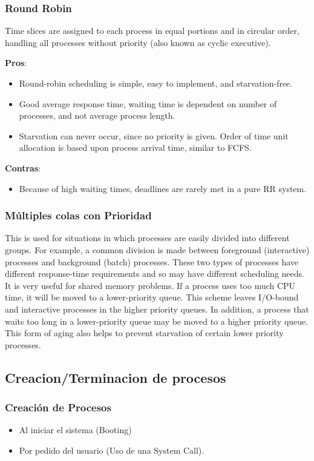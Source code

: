 \documentclass[a4paper, twoside]{article}
\begin{document}
\subsubsection{Round Robin}
Time slices are assigned to each process in equal portions and in circular order, handling all processes without priority (also known as cyclic executive). 

\textbf{Pros}:
\begin{itemize}
	\item Round-robin scheduling is simple, easy to implement, and starvation-free.
	\item Good average response time, waiting time is dependent on number of processes, and not average process length.
	\item Starvation can never occur, since no priority is given. Order of time unit allocation is based upon process arrival time, similar to FCFS.
\end{itemize}

\textbf{Contras}:
\begin{itemize}
	\item Because of high waiting times, deadlines are rarely met in a pure RR system.
\end{itemize}

\subsubsection{Múltiples colas con Prioridad}
This is used for situations in which processes are easily divided into different groups. For example, a common division is made between foreground (interactive) processes and background (batch) processes. These two types of processes have different response-time requirements and so may have different scheduling needs. It is very useful for shared memory problems.
If a process uses too much CPU time, it will be moved to a lower-priority queue. This scheme leaves I/O-bound and interactive processes in the higher priority queues. In addition, a process that waits too long in a lower-priority queue may be moved to a higher priority queue. This form of aging also helps to prevent starvation of certain lower priority processes.

\subsection{Creacion/Terminacion de procesos}
\subsubsection{Creación de Procesos}
\begin{itemize}
	\item Al iniciar el sistema (Booting)
	\item Por pedido del usuario (Uso de una System Call).
\end{itemize}
\end{document}
